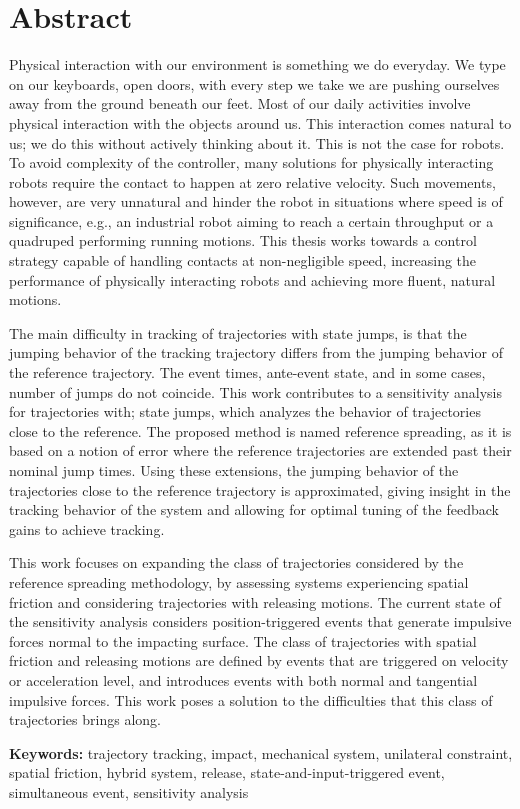\documentclass[../DC2019003Bouma.tex]{subfiles}
\begin{document}
\cleartooddpage
{}
\chapter*{Abstract}
Physical interaction with our environment is something we do everyday. We type on our keyboards, open doors, with every step we take we are pushing ourselves away from the ground beneath our feet. Most of our daily activities involve physical interaction with the objects around us. This interaction comes natural to us; we do this without actively thinking about it. This is not the case for robots. To avoid complexity of the controller, many solutions for physically interacting robots require the contact to happen at zero relative velocity. Such movements, however, are very unnatural and hinder the robot in situations where speed is of significance, e.g., an industrial robot aiming to reach a certain throughput or a quadruped performing running motions. This thesis works towards a control strategy capable of handling contacts at non-negligible speed, increasing the performance of physically interacting robots and achieving more fluent, natural motions.

The main difficulty in tracking of trajectories with state jumps, is that the jumping behavior of the tracking trajectory differs from the jumping behavior of the reference trajectory. The event times, ante-event state, and in some cases, number of jumps do not coincide. This work contributes to a sensitivity analysis for trajectories with; state jumps, which analyzes the behavior of trajectories close to the reference. The proposed method is named reference spreading, as it is based on a notion of error where the reference trajectories are extended past their nominal jump times. Using these extensions, the jumping behavior of the trajectories close to the reference trajectory is approximated, giving insight in the tracking behavior of the system and allowing for optimal tuning of the feedback gains to achieve tracking. 

This work focuses on expanding the class of trajectories considered by the reference spreading methodology, by assessing systems experiencing spatial friction and considering trajectories with releasing motions. The current state of the sensitivity analysis considers position-triggered events that generate impulsive forces normal to the impacting surface. The class of trajectories with spatial friction and releasing motions are defined by events that are triggered on velocity or acceleration level, and introduces events with both normal and tangential impulsive forces. This work poses a solution to the difficulties that this class of trajectories brings along.


\textbf{Keywords:} \quad trajectory tracking, impact, mechanical system, unilateral constraint, spatial friction, hybrid system, release, state-and-input-triggered event, simultaneous event, sensitivity analysis
\end{document}
